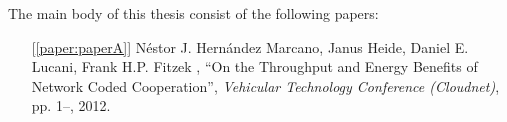 \noindent The main body of this thesis consist of the following papers:
\begin{itemize}

   \item[{[\ref{paper:paperA}]}] N\'estor J. Hern\'andez Marcano, Janus Heide, Daniel E. Lucani, Frank H.P. Fitzek  , ``On the Throughput and Energy Benefits of Network Coded Cooperation'', \emph{Vehicular Technology Conference (Cloudnet)}, pp. 1--, 2012.







\end{itemize}

